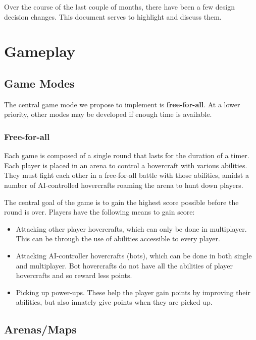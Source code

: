 \documentclass{article}
\theoremstyle{definition}
\begin{document}
Over the course of the last couple of months, there have been a few design
decision changes. This document serves to highlight and discuss them.

\section{Gameplay}

\subsection{Game Modes}

The central game mode we propose to implement is \textbf{free-for-all}. At a lower
priority, other modes may be developed if enough time is available.

\subsubsection{Free-for-all}

Each game is composed of a single round that lasts for the duration of a timer.
Each player is placed in an arena to control a hovercraft with various
abilities. They must fight each other in a free-for-all battle with those
abilities, amidst a number of AI-controlled hovercrafts roaming the arena to
hunt down players.

The central goal of the game is to gain the highest score possible before the
round is over. Players have the following means to gain score:
\begin{itemize}
  \item Attacking other player hovercrafts, which can only be done in
    multiplayer. This can be through the use of abilities accessible to every
    player.
  \item Attacking AI-controller hovercrafts (bots), which can be done in both
    single and multiplayer. Bot hovercrafts do not have all the abilities of
    player hovercrafts and so reward less points.
  \item Picking up power-ups. These help the player gain points by improving
    their abilities, but also innately give points when they are picked up.
\end{itemize}

\subsection{Arenas/Maps}

\end{document}
